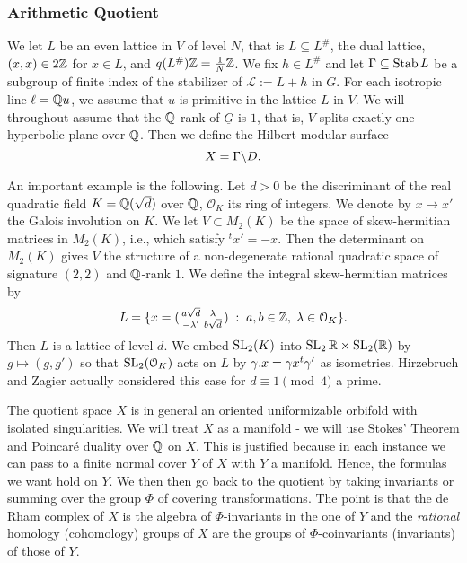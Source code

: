 \subsubsection{Arithmetic Quotient}


We let $L$ be an even lattice in $V$ of level $N$, that is $L \subseteq L^{\#}$, the dual lattice, $(x,x) \in 2 \mathbb{Z}$ for $x \in L$, and $q(L^{\#}) \mathbb{Z} = \tfrac1{N}\mathbb{Z}$. We fix $h \in L^{\#}$ and let $\Gamma \subseteq \operatorname{Stab}{L}$ be a subgroup of finite index of the stabilizer of $\mathcal{L}:=L+h$ in $G$. For each isotropic line $\ell =\mathbb{Q} u$, we assume that $u$ is primitive in the lattice $L$ in $V$. We will throughout assume that the $\mathbb{Q}$-rank of $\underline{G}$ is $1$, that is, $V$ splits exactly one hyperbolic plane over $\mathbb{Q}$. Then we define the Hilbert modular surface
\[
X = \Gamma \backslash D.
\]

\begin{example}\label{HZex}

An important example is the following. Let $d>0$ be the discriminant of the real quadratic field $K = \mathbb{Q}(\sqrt{d})$ over $\mathbb{Q}$, $\mathcal{O}_K$ its ring of integers. We denote by $x \mapsto x'$
the Galois involution on $K$. We let $V \subset M_2(K)$ be the space
of skew-hermitian matrices in $M_2(K)$, i.e., which satisfy $^tx' =-x$. Then the determinant on $M_2(K)$ gives $V$ the structure of a non-degenerate rational quadratic space of signature $(2,2)$ and $\mathbb{Q}$-rank $1$. We define the integral skew-hermitian matrices by 
\begin{equation*}
L = \{ x = ( \begin{smallmatrix} a\sqrt{d}&\lambda\\-\lambda'&b\sqrt{d}
  \end{smallmatrix}  ) \; : \; a,b \in \mathbb{Z}, \; \lambda  \in
  \mathcal{O}_K \}.
\end{equation*}
 Then $L$ is a lattice of level $d$. We embed $\operatorname{SL}_2(K)$ into $\operatorname{SL}_2{\mathbb{R}} \times \operatorname{SL}_2(\mathbb{R})$ by $g \mapsto (g,g')$ so that $\operatorname{SL}_2(\mathcal{O}_K)$ acts on $L$ by $\gamma.x = \gamma x{^t\gamma'}$ as isometries. Hirzebruch and Zagier actually considered this case for $d \equiv 1 \pmod{4}$ a prime.
\end{example}

The quotient space $X$ is in general an oriented uniformizable orbifold with isolated singularities.  We will treat $X$ as a manifold - we will use Stokes' Theorem and Poincar\'e duality over $\mathbb{Q}$ on $X$. This is justified because in each instance we can pass to a finite normal cover $Y$ of $X$ with $Y$ a manifold. Hence, the formulas we want hold on $Y$. 
We then then go back to the quotient by taking invariants or summing over the group $\Phi$ of covering transformations. The point is that the de Rham complex of $X$ is the algebra of $\Phi$-invariants in the one of $Y$ and the {\it rational} homology (cohomology) groups of $X$ are the groups of $\Phi$-coinvariants (invariants) of those
 of $Y$. 